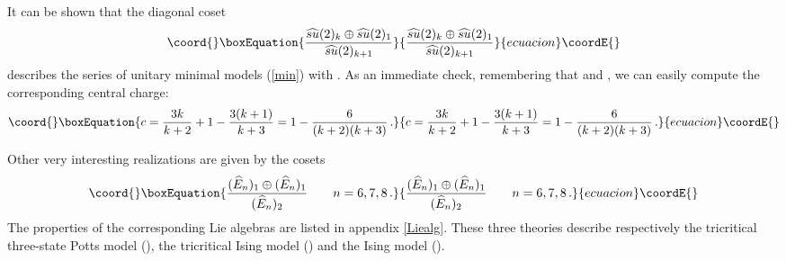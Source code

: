 \documentclass[a4paper,12pt]{report}
\begin{document}
\vspace{0.5cm}

It can be shown that the diagonal coset
\begin{equation}\coord{}\boxEquation{
\frac{\widehat{su}(2)_{k}\oplus\widehat{su}(2)_{1}}{\widehat{su}(2)_{k+1}}
}{
\frac{\widehat{su}(2)_{k}\oplus\widehat{su}(2)_{1}}{\widehat{su}(2)_{k+1}}
}{ecuacion}\coordE{}\end{equation}
describes the series of unitary minimal models (\ref{min}) with \coordHE{}. As an immediate check, remembering
that \coordHE{} and \coordHE{}, we can easily compute the corresponding central charge:
\begin{equation}\coord{}\boxEquation{
c=\frac{3k}{k+2}+1-\frac{3(k+1)}{k+3}=1-\frac{6}{(k+2)(k+3)}\,.
}{
c=\frac{3k}{k+2}+1-\frac{3(k+1)}{k+3}=1-\frac{6}{(k+2)(k+3)}\,.
}{ecuacion}\coordE{}\end{equation}

\vspace{0.5cm}

Other very interesting realizations are given by the cosets
\begin{equation}\coord{}\boxEquation{
\frac{(\widehat{E}_{n})_{1}\oplus(\widehat{E}_{n})_{1}}{(\widehat{E}_{n})_{2}}\qquad n=6,7,8\,.
}{
\frac{(\widehat{E}_{n})_{1}\oplus(\widehat{E}_{n})_{1}}{(\widehat{E}_{n})_{2}}\qquad n=6,7,8\,.
}{ecuacion}\coordE{}\end{equation}
The properties of the corresponding Lie algebras are listed in appendix \ref{Liealg}. These three theories
describe respectively the tricritical three-state Potts model (\coordHE{}), the tricritical Ising model (\coordHE{}) and
the Ising model (\coordHE{}).
\end{document}
